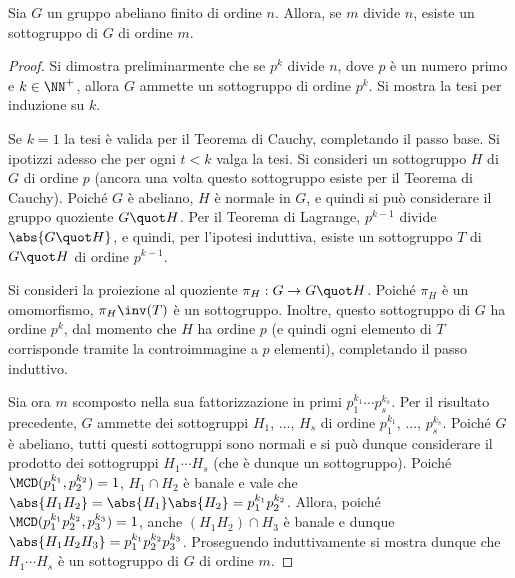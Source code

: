 \documentclass[12pt]{scrartcl}
\begin{document}
	\begin{theorem}
		Sia $G$ un gruppo abeliano finito di ordine $n$.
		Allora, se $m$ divide $n$, esiste un sottogruppo di
		$G$ di ordine $m$.
	\end{theorem}

	\begin{proof}
		Si dimostra preliminarmente che se $p^k$ divide $n$,
		dove $p$ è un numero primo e $k \in \NN^+$, allora
		$G$ ammette un sottogruppo di ordine $p^k$. Si
		mostra la tesi per induzione su $k$. \medskip
		
		
		Se $k=1$ la tesi è valida per il Teorema di Cauchy, completando il passo base. Si ipotizzi adesso
		che per ogni $t < k$ valga la tesi. Si consideri
		un sottogruppo $H$ di $G$ di ordine $p$
		(ancora una volta questo sottogruppo esiste per il
		Teorema di Cauchy). Poiché $G$ è abeliano, $H$ è
		normale in $G$, e quindi si può considerare il
		gruppo quoziente $G \quot H$. Per il Teorema di
		Lagrange, $p^{k-1}$ divide $\abs{G \quot H}$, e
		quindi, per l'ipotesi induttiva, esiste un sottogruppo
		$T$ di $G \quot H$ di ordine $p^{k-1}$. \medskip
		
		
		Si consideri la proiezione al quoziente $\pi_H : G \to G \quot H$. Poiché $\pi_H$ è un omomorfismo,
		$\pi_H\inv(T)$ è un sottogruppo. Inoltre, questo sottogruppo di $G$ ha ordine $p^k$, dal momento che $H$ ha ordine $p$
		(e quindi ogni elemento di $T$ corrisponde tramite
		la controimmagine a $p$ elementi), completando il passo
		induttivo. \medskip
		
		
		Sia ora $m$ scomposto nella sua fattorizzazione in primi
		$p_1^{k_1} \cdots p_s^{k_s}$. Per il risultato precedente,
		$G$ ammette dei sottogruppi $H_1$, ..., $H_s$ di ordine
		$p_1^{k_1}$, ..., $p_s^{k_s}$. Poiché $G$ è abeliano,
		tutti questi sottogruppi sono normali e si può dunque
		considerare il prodotto dei sottogruppi $H_1 \cdots H_s$
		(che è dunque un sottogruppo). Poiché
		$\MCD(p_1^{k_1}, p_2^{k_2})=1$, $H_1 \cap H_2$ è banale e vale
		che $\abs{H_1 H_2} = \abs{H_1} \abs{H_2} = p_1^{k_1} p_2^{k_2}$.
		Allora, poiché $\MCD(p_1^{k_1} p_2^{k_2}, p_3^{k_3}) = 1$, anche $(H_1H_2) \cap H_3$ è banale e dunque $\abs{H_1 H_2 H_3} =
		p_1^{k_1} p_2^{k_2} p_3^{k_3}$. Proseguendo induttivamente
		si mostra dunque che $H_1 \cdots H_s$ è un sottogruppo
		di $G$ di ordine $m$.
	\end{proof}
\end{document}
